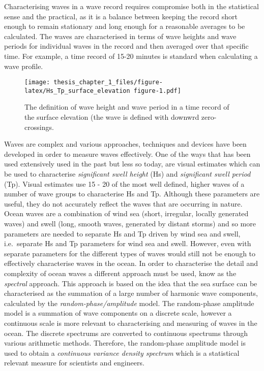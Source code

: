 \documentclass[
]{article}
\begin{document}
Characterising waves in a wave record requires compromise both in the
statistical sense and the practical, as it is a balance between keeping
the record short enough to remain stationary and long enough for a
reasonable averages to be calculated. The waves are characterised in
terms of wave heights and wave periods for individual waves in the
record and then averaged over that specific time. For example, a time
record of 15-20 minutes is standard when calculating a wave profile.

\begin{figure}
\centering
\texttt{[image: thesis\_chapter\_1\_files/figure-latex/Hs\_Tp\_surface\_elevation figure-1.pdf]}
\caption{The definition of wave height and wave period in a time record
of the surface elevation (the wave is defined with downwrd
zero-crossings.}
\end{figure}

Waves are complex and various approaches, techniques and devices have
been developed in order to measure waves effectively. One of the ways
that has been used extensively used in the past but less so today, are
visual estimates which can be used to characterise \emph{significant
swell height} (Hs) and \emph{significant swell period} (Tp). Visual
estimates use 15 - 20 of the most well defined, higher waves of a number
of wave groups to characterise Hs and Tp. Although these parameters are
useful, they do not accurately reflect the waves that are occurring in
nature. Ocean waves are a combination of wind sea (short, irregular,
locally generated waves) and swell (long, smooth waves, generated by
distant storms) and so more parameters are needed to separate Hs and Tp
driven by wind sea and swell, i.e.~separate Hs and Tp parameters for
wind sea and swell. However, even with separate parameters for the
different types of waves would still not be enough to effectively
characterise waves in the ocean. In order to characterise the detail and
complexity of ocean waves a different approach must be used, know as the
\emph{spectral} approach. This approach is based on the idea that the
sea surface can be characterised as the summation of a large number of
harmonic wave components, calculated by the
\emph{random-phase/amplitude} model. The random-phase amplitude model is
a summation of wave components on a discrete scale, however a continuous
scale is more relevant to characterising and measuring of waves in the
ocean. The discrete spectrums are converted to continuous spectrums
through various arithmetic methods. Therefore, the random-phase
amplitude model is used to obtain a \emph{continuous variance density
spectrum} which is a statistical relevant measure for scientists and
engineers.
\end{document}
